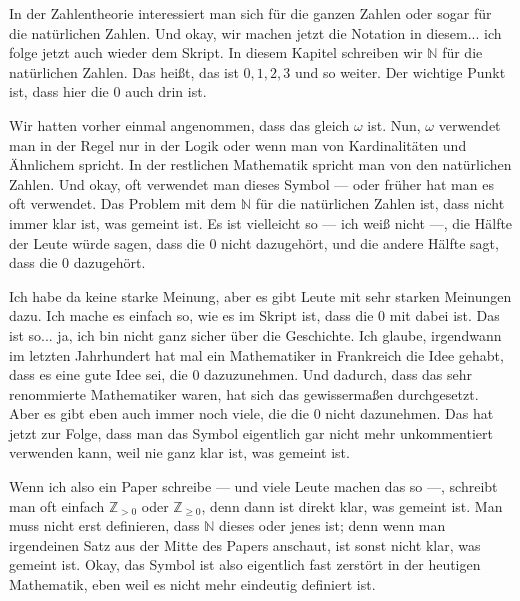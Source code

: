 \begin{spoken-clean}[00:02:15 - 00:04:40]
In der Zahlentheorie interessiert man sich für die ganzen Zahlen oder sogar für die natürlichen Zahlen. Und okay, wir machen jetzt die Notation in diesem... ich folge jetzt auch wieder dem Skript. In diesem Kapitel schreiben wir $\mathbb{N}$ für die natürlichen Zahlen. Das heißt, das ist $0, 1, 2, 3$ und so weiter. Der wichtige Punkt ist, dass hier die $0$ auch drin ist.

Wir hatten vorher einmal angenommen, dass das gleich $\omega$ ist. Nun, $\omega$ verwendet man in der Regel nur in der Logik oder wenn man von Kardinalitäten und Ähnlichem spricht. In der restlichen Mathematik spricht man von den natürlichen Zahlen. Und okay, oft verwendet man dieses Symbol --- oder früher hat man es oft verwendet. Das Problem mit dem $\mathbb{N}$ für die natürlichen Zahlen ist, dass nicht immer klar ist, was gemeint ist. Es ist vielleicht so --- ich weiß nicht ---, die Hälfte der Leute würde sagen, dass die $0$ nicht dazugehört, und die andere Hälfte sagt, dass die $0$ dazugehört.

Ich habe da keine starke Meinung, aber es gibt Leute mit sehr starken Meinungen dazu.  Ich mache es einfach so, wie es im Skript ist, dass die $0$ mit dabei ist. Das ist so... ja, ich bin nicht ganz sicher über die Geschichte. Ich glaube, irgendwann im letzten Jahrhundert hat mal ein Mathematiker in Frankreich die Idee gehabt, dass es eine gute Idee sei, die $0$ dazuzunehmen. Und dadurch, dass das sehr renommierte Mathematiker waren, hat sich das gewissermaßen durchgesetzt. Aber es gibt eben auch immer noch viele, die die $0$ nicht dazunehmen. Das hat jetzt zur Folge, dass man das Symbol eigentlich gar nicht mehr unkommentiert verwenden kann, weil nie ganz klar ist, was gemeint ist.

Wenn ich also ein Paper schreibe --- und viele Leute machen das so ---, schreibt man oft einfach $\mathbb{Z}_{>0}$ oder $\mathbb{Z}_{\ge 0}$, denn dann ist direkt klar, was gemeint ist. Man muss nicht erst definieren, dass $\mathbb{N}$ dieses oder jenes ist; denn wenn man irgendeinen Satz aus der Mitte des Papers anschaut, ist sonst nicht klar, was gemeint ist. Okay, das Symbol ist also eigentlich fast zerstört in der heutigen Mathematik, eben weil es nicht mehr eindeutig definiert ist.
\end{spoken-clean}

